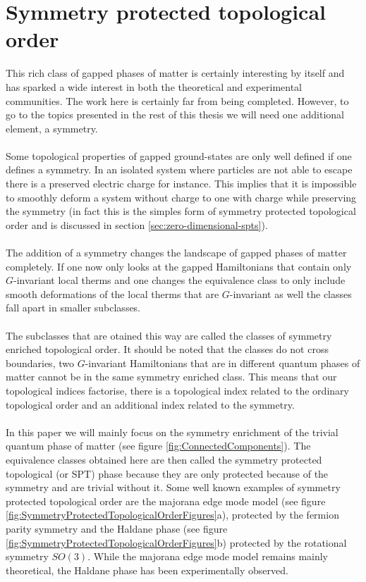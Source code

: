 \section{Symmetry protected topological order}
This rich class of gapped phases of matter is certainly interesting by itself and has sparked a wide interest in both the theoretical and experimental communities. The work here is certainly far from being completed. However, to go to the topics presented in the rest of this thesis we will need one additional element, a symmetry.
\\\\
Some topological properties of gapped ground-states are only well defined if one defines a symmetry. In an isolated system where particles are not able to escape there is a preserved electric charge for instance. This implies that it is impossible to smoothly deform a system without charge to one with charge while preserving the symmetry (in fact this is the simples form of symmetry protected topological order and is discussed in section \ref{sec:zero-dimensional-spts}).
\\\\
The addition of a symmetry changes the landscape of gapped phases of matter completely. If one now only looks at the gapped Hamiltonians that contain only $G$-invariant local therms and one changes the equivalence class to only include smooth deformations of the local therms that are $G$-invariant as well the classes fall apart in smaller subclasses.
\\\\
The subclasses that are otained this way are called the classes of symmetry enriched topological order. It should be noted that the classes do not cross boundaries, two $G$-invariant Hamiltonians that are in different quantum phases of matter cannot be in the same symmetry enriched class. This means that our topological indices factorise, there is a topological index related to the ordinary topological order and an additional index related to the symmetry.
\\\\
In this paper we will mainly focus on the symmetry enrichment of the trivial quantum phase of matter (see figure \ref{fig:ConnectedComponents}). The equivalence classes obtained here are then called the symmetry protected topological (or SPT) phase because they are only protected because of the symmetry and are trivial without it. Some well known examples of symmetry protected topological order are the majorana edge mode model (see figure \ref{fig:SymmetryProtectedTopologicalOrderFigures}a), protected by the fermion parity symmetry and the Haldane phase (see figure \ref{fig:SymmetryProtectedTopologicalOrderFigures}b) protected by the rotational symmetry $SO(3)$. While the majorana edge mode model remains mainly theoretical, the Haldane phase has been experimentally\cite{sompet2022realizing} observed.

